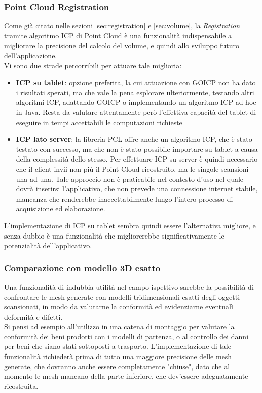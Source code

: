 \subsubsection{Point Cloud Registration}
Come già citato nelle sezioni \ref{sec:registration} e \ref{sec:volume}, la \emph{Registration} tramite algoritmo ICP di Point Cloud è una funzionalità indispensabile a migliorare la precisione del calcolo del volume, e quindi allo sviluppo futuro dell'applicazione. \\
Vi sono due strade percorribili per attuare tale miglioria:
\begin{itemize}
\item \textbf{ICP su tablet}: opzione preferita, la cui attuazione con GOICP non ha dato i risultati sperati, ma che vale la pena esplorare ulteriormente, testando altri algoritmi ICP, adattando GOICP o implementando un algoritmo ICP ad hoc in Java. Resta da valutare attentamente però l'effettiva capacità del tablet di eseguire in tempi accettabili le computazioni richieste
\item \textbf{ICP lato server}: la libreria PCL offre anche un algoritmo ICP, che è stato testato con successo, ma che non è stato possibile importare su tablet a causa della complessità dello stesso. Per effettuare ICP su server è quindi necessario che il client invii non più il Point Cloud ricostruito, ma le singole scansioni una ad una. Tale approccio non è praticabile nel contesto d'uso nel quale dovrà inserirsi l'applicativo, che non prevede una connessione internet stabile, mancanza che renderebbe inaccettabilmente lungo l'intero processo di acquisizione ed elaborazione.
\end{itemize}
\noindent
L'implementazione di ICP su tablet sembra quindi essere l'alternativa migliore, e senza dubbio è una funzionalità che migliorerebbe significativamente le potenzialità dell'applicativo.

\subsubsection{Comparazione con modello 3D esatto}
Una funzionalità di indubbia utilità nel campo ispettivo sarebbe la possibilità di confrontare le mesh generate con modelli tridimensionali esatti degli oggetti scansionati, in modo da valutarne la conformità ed evidenziarne eventualì deformità e difetti.\\
 Si pensi ad esempio all'utilizzo in una catena di montaggio per valutare la conformità dei beni prodotti con i modelli di partenza, o al controllo dei danni per beni che siano stati sottoposti a trasporto.
L'implementazione di tale funzionalità richiederà prima di tutto una maggiore precisione delle mesh generate, che dovranno anche essere completamente "chiuse", dato che al momento le mesh mancano della parte inferiore, che dev'essere adeguatamente ricostruita.

